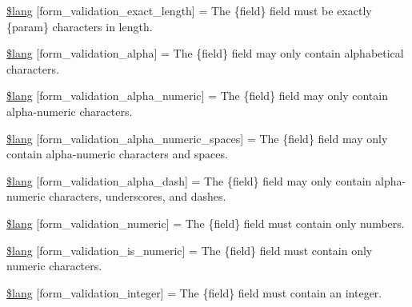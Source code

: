 \begin{DoxyCompactItemize}
\item 
\mbox{\hyperlink{form__validation__lang_8php_af3bc1553bbee67384ccabfb19f901a0a}{\$lang}} \mbox{[}\textquotesingle{}form\+\_\+validation\+\_\+exact\+\_\+length\textquotesingle{}\mbox{]} = \textquotesingle{}The \{field\} field must be exactly \{param\} characters in length.\textquotesingle{}
\item 
\mbox{\hyperlink{form__validation__lang_8php_ae29211484726ff85b1243d8736664db4}{\$lang}} \mbox{[}\textquotesingle{}form\+\_\+validation\+\_\+alpha\textquotesingle{}\mbox{]} = \textquotesingle{}The \{field\} field may only contain alphabetical characters.\textquotesingle{}
\item 
\mbox{\hyperlink{form__validation__lang_8php_a868f2756e3f0886b6b35cb879878be17}{\$lang}} \mbox{[}\textquotesingle{}form\+\_\+validation\+\_\+alpha\+\_\+numeric\textquotesingle{}\mbox{]} = \textquotesingle{}The \{field\} field may only contain alpha-\/numeric characters.\textquotesingle{}
\item 
\mbox{\hyperlink{form__validation__lang_8php_ae6c93d16569d49fd9e9bda81a1dc46e6}{\$lang}} \mbox{[}\textquotesingle{}form\+\_\+validation\+\_\+alpha\+\_\+numeric\+\_\+spaces\textquotesingle{}\mbox{]} = \textquotesingle{}The \{field\} field may only contain alpha-\/numeric characters and spaces.\textquotesingle{}
\item 
\mbox{\hyperlink{form__validation__lang_8php_a65e5c17cc79ed4481910f1d26f684957}{\$lang}} \mbox{[}\textquotesingle{}form\+\_\+validation\+\_\+alpha\+\_\+dash\textquotesingle{}\mbox{]} = \textquotesingle{}The \{field\} field may only contain alpha-\/numeric characters, underscores, and dashes.\textquotesingle{}
\item 
\mbox{\hyperlink{form__validation__lang_8php_aae9865438558fdb469fd952f683f29c4}{\$lang}} \mbox{[}\textquotesingle{}form\+\_\+validation\+\_\+numeric\textquotesingle{}\mbox{]} = \textquotesingle{}The \{field\} field must contain only numbers.\textquotesingle{}
\item 
\mbox{\hyperlink{form__validation__lang_8php_a91d65bc40a96da1fb551ab491da779fc}{\$lang}} \mbox{[}\textquotesingle{}form\+\_\+validation\+\_\+is\+\_\+numeric\textquotesingle{}\mbox{]} = \textquotesingle{}The \{field\} field must contain only numeric characters.\textquotesingle{}
\item 
\mbox{\hyperlink{form__validation__lang_8php_a9a483842a44c5006ad4c6eb9cff5d0da}{\$lang}} \mbox{[}\textquotesingle{}form\+\_\+validation\+\_\+integer\textquotesingle{}\mbox{]} = \textquotesingle{}The \{field\} field must contain an integer.\textquotesingle{}

\end{DoxyCompactItemize}
